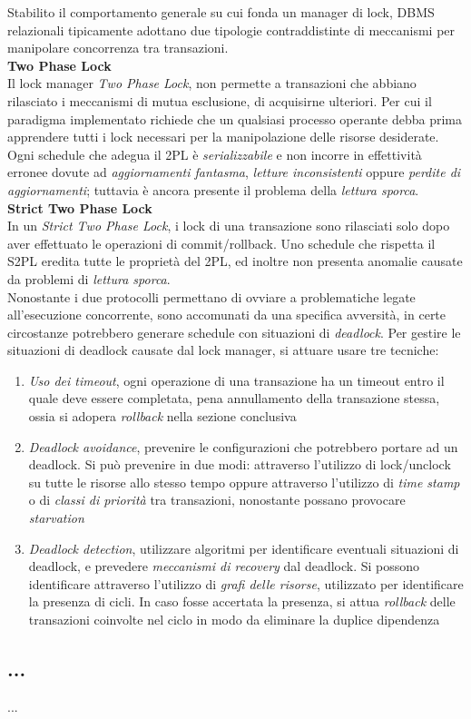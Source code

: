 \documentclass{article}
\begin{document}
Stabilito il comportamento generale su cui fonda un manager di lock, DBMS relazionali tipicamente adottano due tipologie contraddistinte di meccanismi per manipolare concorrenza tra transazioni.\vspace*{14pt}\\
\textbf{Two Phase Lock}\\
Il lock manager \textit{Two Phase Lock}, non permette a transazioni che abbiano rilasciato i meccanismi di mutua esclusione, di acquisirne ulteriori. Per cui il paradigma implementato richiede che un qualsiasi processo operante debba prima apprendere tutti i lock necessari per la manipolazione delle risorse desiderate. Ogni schedule che adegua il 2PL è \textit{serializzabile} e non incorre in effettività erronee dovute ad \textit{aggiornamenti fantasma}, \textit{letture inconsistenti} oppure \textit{perdite di aggiornamenti}; tuttavia è ancora presente il problema della \textit{lettura sporca}.\vspace*{14pt}\\
\textbf{Strict Two Phase Lock}\\
In un \textit{Strict Two Phase Lock}, i lock di una transazione sono rilasciati solo dopo aver effettuato le operazioni di commit/rollback.
Uno schedule che rispetta il S2PL eredita tutte le proprietà del 2PL, ed inoltre non presenta anomalie causate da problemi di \textit{lettura sporca}.\vspace{14pt}\\
Nonostante i due protocolli permettano di ovviare a problematiche legate all'esecuzione concorrente, sono accomunati da una specifica avversità, in certe circostanze potrebbero generare schedule con situazioni di \textit{deadlock}. Per gestire le situazioni di deadlock causate dal lock manager, si attuare usare tre tecniche:
\begin{enumerate}[label={-}]
    \item \textit{Uso dei timeout}, ogni operazione di una transazione ha un timeout entro il quale deve essere completata, pena annullamento della transazione stessa, ossia si adopera \textit{rollback} nella sezione conclusiva
    \item \textit{Deadlock avoidance}, prevenire le configurazioni che potrebbero portare ad un deadlock. Si può prevenire in due modi: attraverso l'utilizzo di lock/unclock su tutte le risorse allo stesso tempo oppure attraverso l'utilizzo di \textit{time stamp} o di \textit{classi di priorità} tra transazioni, nonostante possano provocare \textit{starvation}
    \item \textit{Deadlock detection}, utilizzare algoritmi per identificare eventuali situazioni di deadlock, e prevedere \textit{meccanismi di recovery} dal deadlock. Si possono identificare attraverso l'utilizzo di \textit{grafi delle risorse}, utilizzato per identificare la presenza di cicli. In caso fosse accertata la presenza, si attua \textit{rollback} delle transazioni coinvolte nel ciclo in modo da eliminare la duplice dipendenza
\end{enumerate}

\subsection*{...}
\large
...
\end{document}
